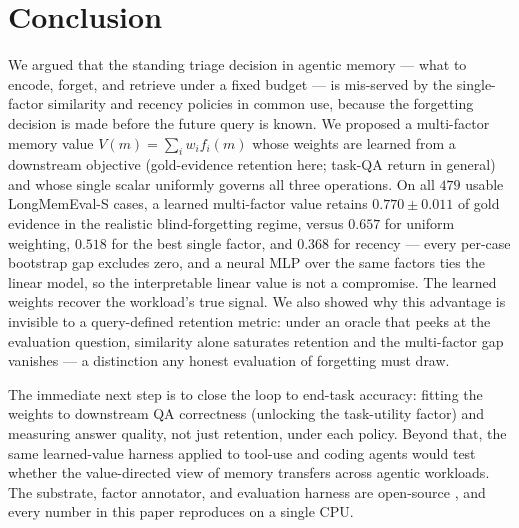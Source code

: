 \section{Conclusion}
\label{sec:conclusion}

We argued that the standing triage decision in agentic memory --- what to
encode, forget, and retrieve under a fixed budget --- is mis-served by
the single-factor similarity and recency policies in common use, because
the forgetting decision is made before the future query is known. We
proposed a multi-factor memory value $V(m)=\sum_i w_i f_i(m)$ whose
weights are learned from a downstream objective (gold-evidence retention
here; task-QA return in general) and whose single scalar uniformly
governs all three operations. On all $479$ usable LongMemEval-S cases, a
learned multi-factor value retains $0.770\pm0.011$ of gold evidence in the
realistic blind-forgetting regime, versus $0.657$ for uniform weighting,
$0.518$ for the best single factor, and $0.368$ for recency --- every
per-case bootstrap gap excludes zero, and a neural MLP over the same
factors ties the linear model, so the interpretable linear value is not a
compromise. The learned weights recover the workload's true signal. We also showed why this advantage is invisible to a query-defined
retention metric: under an oracle that peeks at the evaluation question,
similarity alone saturates retention and the multi-factor gap vanishes
--- a distinction any honest evaluation of forgetting must draw.

The immediate next step is to close the loop to end-task accuracy:
fitting the weights to downstream QA correctness (unlocking the
task-utility factor) and measuring answer quality, not just retention,
under each policy. Beyond that, the same learned-value harness applied to
tool-use and coding agents would test whether the value-directed view of
memory transfers across agentic workloads. The substrate, factor
annotator, and evaluation harness are open-source
\citep{chen2026borge}, and every number in this paper reproduces on a
single CPU.
